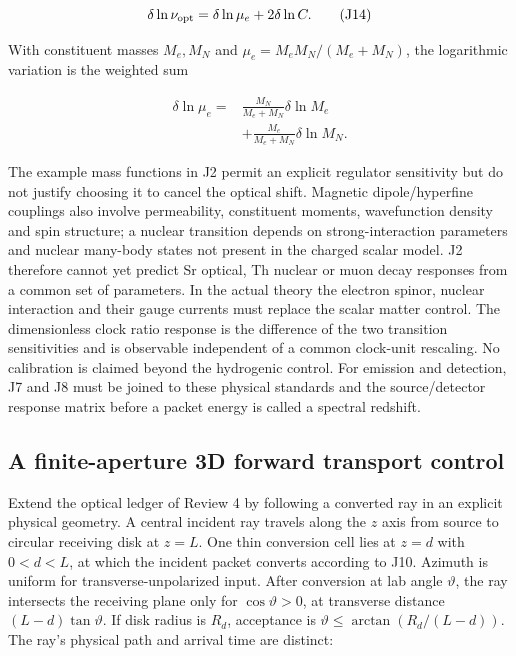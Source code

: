 \documentclass[
  11pt,
  twoside]{article}
\begin{document}
\[\delta\ln\nu_{\rm opt}=\delta\ln\mu_e+2\delta\ln C.\tag{J14}\]

With constituent masses \(M_e,M_N\) and \(\mu_e=M_eM_N/(M_e+M_N)\), the
logarithmic variation is the weighted sum

\[\begin{aligned}
\delta\ln\mu_e={}&\frac{M_N}{M_e+M_N}\delta\ln M_e\\
&+\frac{M_e}{M_e+M_N}\delta\ln M_N.
\end{aligned}\]

The example mass functions in J2 permit an explicit regulator
sensitivity but do not justify choosing it to cancel the optical shift.
Magnetic dipole/hyperfine couplings also involve permeability,
constituent moments, wavefunction density and spin structure; a nuclear
transition depends on strong-interaction parameters and nuclear
many-body states not present in the charged scalar model. J2 therefore
cannot yet predict Sr optical, Th nuclear or muon decay responses from a
common set of parameters. In the actual theory the electron spinor,
nuclear interaction and their gauge currents must replace the scalar
matter control. The dimensionless clock ratio response is the difference
of the two transition sensitivities and is observable independent of a
common clock-unit rescaling. No calibration is claimed beyond the
hydrogenic control. For emission and detection, J7 and J8 must be joined
to these physical standards and the source/detector response matrix
before a packet energy is called a spectral redshift.

\subsection{A finite-aperture 3D forward transport
control}\label{a-finite-aperture-3d-forward-transport-control}

Extend the optical ledger of Review 4 by following a converted ray in an
explicit physical geometry. A central incident ray travels along the
\(z\) axis from source to circular receiving disk at \(z=L\). One thin
conversion cell lies at \(z=d\) with \(0<d<L\), at which the incident
packet converts according to J10. Azimuth is uniform for
transverse-unpolarized input. After conversion at lab angle
\(\vartheta\), the ray intersects the receiving plane only for
\(\cos\vartheta>0\), at transverse distance \((L-d)\tan\vartheta\). If
disk radius is \(R_d\), acceptance is
\(\vartheta\leq\arctan(R_d/(L-d))\). The ray's physical path and arrival
time are distinct:
\end{document}
